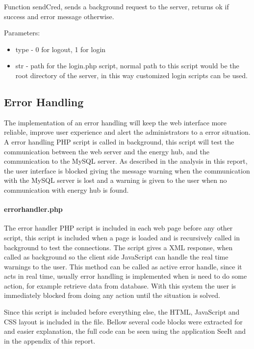 Function sendCred, sends a background request to the server, returns ok if success and error message otherwise. 

Parameters:
\begin{itemize}
	\item type - 0 for logout, 1 for login
	\item str - path for the login.php script, normal path to this script would be the root directory of the server, in this way customized login scripts can be used.
\end{itemize}

%
%
%
%
%
%

\subsection{Error Handling}
The implementation of an error handling will keep the web interface more reliable, improve user experience and alert the administrators to a error situation. A error handling PHP script is called in background, this script will test the communication between the web server and the energy hub, and the communication to the MySQL server. As described in the analysis in this report, the user interface is blocked giving the message warning when the communication with the MySQL server is lost and a warning is given to the user when no communication with energy hub is found.

\paragraph{errorhandler.php} The error handler PHP script is included in each web page before any other script, this script is included when a page is loaded and is recursively called in background to test the connections. The script gives a XML response, when called as background so the client side JavaScript can handle the real time warnings to the user. This method can be called as active error handle, since it acts in real time, usually error handling is implemented when is need to do some action, for example retrieve data from database. With this system the user is immediately blocked from doing any action until the situation is solved.

Since this script is included before everything else, the HTML, JavaScript and CSS layout is included in the file. Bellow several code blocks were extracted for and easier explanation, the full code can be seen using the application SeeIt and in the appendix of this report.

